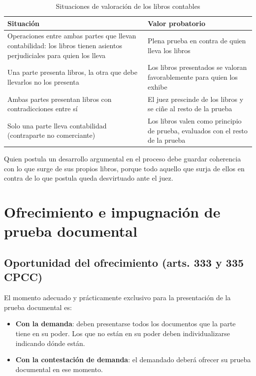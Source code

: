 \documentclass[12pt,oneside]{book}
\begin{document}
\begin{table}[H]
\centering
\caption{Situaciones de valoración de los libros contables}
\begin{tabularx}{\textwidth}{>{\raggedright\arraybackslash}X >{\raggedright\arraybackslash}X}
\toprule
\textbf{Situación} & \textbf{Valor probatorio} \\
\midrule
Operaciones entre ambas partes que llevan contabilidad: los libros tienen asientos perjudiciales para quien los lleva & Plena prueba en contra de quien lleva los libros \\
Una parte presenta libros, la otra que debe llevarlos no los presenta & Los libros presentados se valoran favorablemente para quien los exhibe \\
Ambas partes presentan libros con contradicciones entre sí & El juez prescinde de los libros y se ciñe al resto de la prueba \\
Solo una parte lleva contabilidad (contraparte no comerciante) & Los libros valen como principio de prueba, evaluados con el resto de la prueba \\
\bottomrule
\end{tabularx}
\end{table}

Quien postula un desarrollo argumental en el proceso debe guardar coherencia con lo que surge de sus propios libros, porque todo aquello que surja de ellos en contra de lo que postula queda desvirtuado ante el juez.

\chapter{Ofrecimiento e impugnación de prueba documental}

\section{Oportunidad del ofrecimiento (arts. 333 y 335 CPCC)}

El momento adecuado y prácticamente exclusivo para la presentación de la prueba documental es:

\begin{itemize}
    \item \textbf{Con la demanda}: deben presentarse todos los documentos que la parte tiene en su poder. Los que no están en su poder deben individualizarse indicando dónde están.
    \item \textbf{Con la contestación de demanda}: el demandado deberá ofrecer su prueba documental en ese momento.
\end{itemize}
\end{document}
